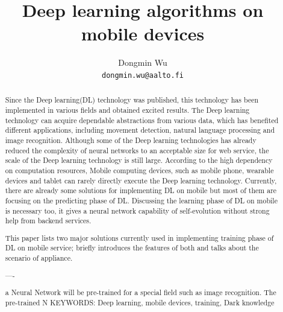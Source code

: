 \documentclass[article]{aaltoseries}
\begin{document}
 

\title{Deep learning algorithms on mobile devices}

\author{Dongmin Wu
\\\textnormal{\texttt{dongmin.wu@aalto.fi}}} %


\maketitle


\begin{abstract}

  Since the Deep learning(DL) technology was published, this technology has been
  implemented in various fields and obtained excited results. The Deep learning technology can acquire 
  dependable abstractions from various data, which has benefited different applications, 
  including movement detection, natural language processing and image recognition. 
  Although some of the Deep learning technologies 
  has already reduced the complexity of neural networks to an acceptable size for web service, the 
 scale of the Deep learning technology is still large. 
 According to the high dependency on computation resources,
 Mobile computing devices, such as mobile phone,
  wearable devices and tablet can rarely directly execute the Deep learning technology. 
 Currently, there are already some solutions for implementing DL on mobile\cite{Ota:2017}
 but most of them are focusing on the predicting phase of DL. 
 Discussing the learning phase of DL on mobile is necessary too, 
 it gives a neural network capability of self-evolution without strong help from backend services.

 This paper lists two major solutions currently used in implementing training phase of DL on mobile service;
 briefly introduces the features of both and talks about the scenario of appliance. 


  ----

 a Neural Network will be pre-trained for a special field such as image recognition. 
 The pre-trained N
\vspace{3mm}
\noindent KEYWORDS: Deep learning, mobile devices, training, Dark knowledge

\end{abstract}
\end{document}
